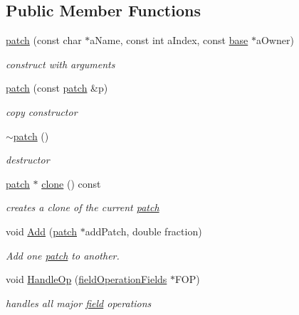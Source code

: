 \subsection*{Public Member Functions}
\begin{DoxyCompactItemize}
\item 
\hyperlink{classpatch_a962e1a1e7f87bd16d323c472e5dafbf0}{patch} (const char $\ast$aName, const int aIndex, const \hyperlink{classbase}{base} $\ast$aOwner)
\begin{DoxyCompactList}\small\item\em construct with arguments \item\end{DoxyCompactList}\item 
\hyperlink{classpatch_adb9e4cd6ab9f2df28a8c57e330b55719}{patch} (const \hyperlink{classpatch}{patch} \&p)
\begin{DoxyCompactList}\small\item\em copy constructor \item\end{DoxyCompactList}\item 
\hyperlink{classpatch_a673a341f34953f79c30d82b27a55ba7a}{$\sim$patch} ()
\begin{DoxyCompactList}\small\item\em destructor \item\end{DoxyCompactList}\item 
\hyperlink{classpatch}{patch} $\ast$ \hyperlink{classpatch_a132e795ca186b7b274a4b69e3e19e127}{clone} () const 
\begin{DoxyCompactList}\small\item\em creates a clone of the current \hyperlink{classpatch}{patch} \item\end{DoxyCompactList}\item 
void \hyperlink{classpatch_ace800e40d39f187d3d37b7d87b972a62}{Add} (\hyperlink{classpatch}{patch} $\ast$addPatch, double fraction)
\begin{DoxyCompactList}\small\item\em Add one \hyperlink{classpatch}{patch} to another. \item\end{DoxyCompactList}\item 
void \hyperlink{classpatch_ac47bef0c79638b0c203bbdc2ef2a0408}{HandleOp} (\hyperlink{classfield_operation_fields}{fieldOperationFields} $\ast$FOP)
\begin{DoxyCompactList}\small\item\em handles all major \hyperlink{classfield}{field} operations \item\end{DoxyCompactList}\item 

\end{DoxyCompactItemize}

